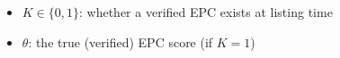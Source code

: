 \begin{itemize}
    \item $K \in \{0,1\}$: whether a verified EPC exists at listing time
    \item $\theta$: the true (verified) EPC score (if $K = 1$)
\end{itemize}
